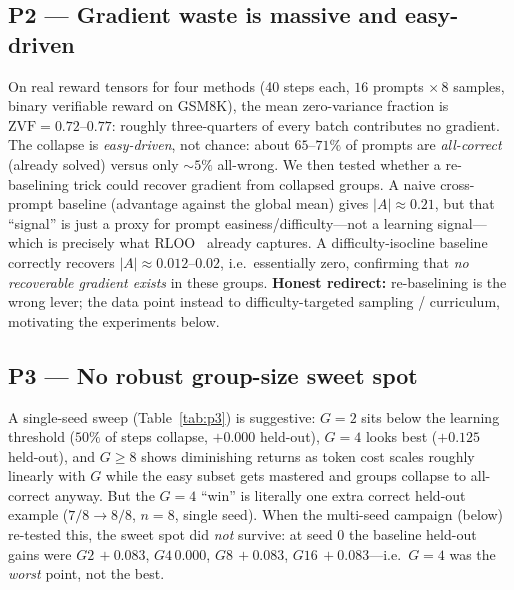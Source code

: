 \documentclass[12pt,a4paper]{report}
\newcommand{\zvf}{\mathrm{ZVF}}
\begin{document}
\subsection{P2 --- Gradient waste is massive and easy-driven}
On real reward tensors for four methods (40 steps each, $16$ prompts
$\times\,8$ samples, binary verifiable reward on GSM8K), the mean zero-variance
fraction is $\zvf = 0.72$--$0.77$: roughly three-quarters of every batch
contributes no gradient. The collapse is \emph{easy-driven}, not chance: about
$65$--$71\%$ of prompts are \emph{all-correct} (already solved) versus only
${\sim}5\%$ all-wrong. We then tested whether a re-baselining trick could recover
gradient from collapsed groups. A naive cross-prompt baseline (advantage against
the global mean) gives $|A|\approx0.21$, but that ``signal'' is just a proxy for
prompt easiness/difficulty---not a learning signal---which is precisely what
RLOO~\cite{ahmadian2024rloo} already captures. A difficulty-isocline baseline
correctly recovers $|A|\approx0.012$--$0.02$, i.e.\ essentially zero, confirming
that \emph{no recoverable gradient exists} in these groups. \textbf{Honest
redirect:} re-baselining is the wrong lever; the data point instead to
difficulty-targeted sampling / curriculum, motivating the experiments below.

\subsection{P3 --- No robust group-size sweet spot}

A single-seed sweep (Table~\ref{tab:p3}) is suggestive: $G{=}2$ sits below the
learning threshold ($50\%$ of steps collapse, $+0.000$ held-out), $G{=}4$ looks
best ($+0.125$ held-out), and $G\ge8$ shows diminishing returns as token cost
scales roughly linearly with $G$ while the easy subset gets mastered and groups
collapse to all-correct anyway. But the $G{=}4$ ``win'' is literally one extra
correct held-out example ($7/8 \to 8/8$, $n=8$, single seed). When the multi-seed
campaign (below) re-tested this, the sweet spot did \emph{not} survive: at seed 0
the baseline held-out gains were $G2\,{+}0.083$, $G4\,{0.000}$, $G8\,{+}0.083$,
$G16\,{+}0.083$---i.e.\ $G{=}4$ was the \emph{worst} point, not the best.
\end{document}
